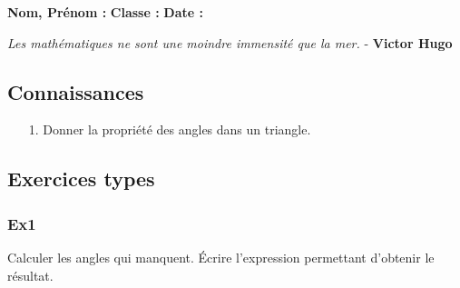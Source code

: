 \documentclass[11pt]{article}
\newcommand{\Pointilles}[1][3]{%
  \multido{}{#1}{\makebox[\linewidth]{\dotfill}\\[\parskip]
}}
\begin{document}
\setlength{\columnseprule}{1pt}

\textbf{Nom, Prénom :} \hspace{8cm} \textbf{Classe :} \hspace{3cm} \textbf{Date :}\\
\vspace{-0.8cm}
\begin{center}
  \textit{Les mathématiques ne sont une moindre immensité que la mer.}  - \textbf{Victor Hugo}
\end{center}
\vspace{-0.8cm}

\subsection*{Connaissances}

\begin{enumerate}
  \item[1.] Donner la propriété des angles dans un triangle. 
\end{enumerate}

\Pointilles[5]

\subsection*{Exercices types}

\subsubsection*{Ex1}

Calculer les angles qui manquent. Écrire l'expression permettant d'obtenir le résultat. 
\end{document}
